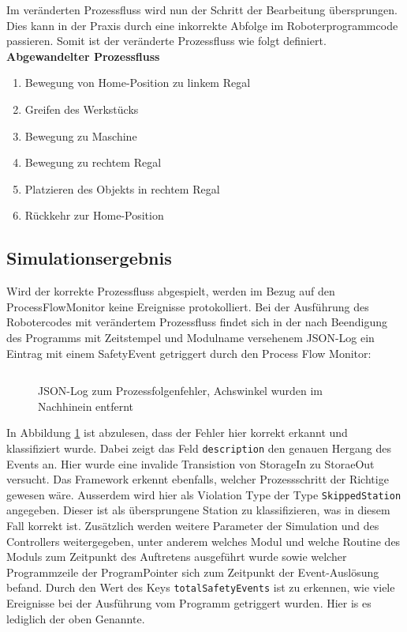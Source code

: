 Im veränderten Prozessfluss wird nun der Schritt der Bearbeitung übersprungen.
Dies kann in der Praxis durch eine inkorrekte Abfolge im Roboterprogrammcode
passieren. Somit ist der veränderte Prozessfluss wie folgt definiert.\\

\noindent
\textbf{Abgewandelter Prozessfluss}
\begin{enumerate}
  \item Bewegung von Home-Position zu linkem Regal
  \item Greifen des Werkstücks
  \item Bewegung zu Maschine
  \item Bewegung zu rechtem Regal
  \item Platzieren des Objekts in rechtem Regal
  \item Rückkehr zur Home-Position
\end{enumerate}

\subsection{Simulationsergebnis}
Wird der korrekte Prozessfluss abgespielt, werden im Bezug auf den
ProcessFlowMonitor keine Ereignisse protokolliert.
Bei der Ausführung des Robotercodes mit verändertem Prozessfluss findet sich in
der nach Beendigung des Programms mit Zeitstempel und Modulname versehenem
JSON-Log ein Eintrag mit einem SafetyEvent getriggert durch den
Process Flow Monitor:
\begin{figure}[H]
  \inputminted[fontsize=\footnotesize]{json}{code-snippets/processflowerror.json}
  \caption{JSON-Log zum Prozessfolgenfehler, Achswinkel wurden im Nachhinein
  entfernt}
  \label{listing:processflowerror}
\end{figure}

\noindent In Abbildung \ref{listing:processflowerror} ist abzulesen, dass der
Fehler hier korrekt erkannt und klassifiziert wurde. Dabei zeigt das Feld
\texttt{description} den genauen Hergang des Events an. Hier wurde eine invalide
Transistion von StorageIn zu StoraeOut versucht. Das Framework erkennt
ebenfalls, welcher Prozessschritt der Richtige gewesen wäre. Ausserdem wird hier
als Violation Type der Type \texttt{SkippedStation} angegeben. Dieser ist als
übersprungene Station zu klassifizieren, was in diesem Fall korrekt ist.
Zusätzlich werden weitere Parameter der Simulation und des Controllers
weitergegeben, unter anderem welches Modul und welche Routine des Moduls zum
Zeitpunkt des Auftretens ausgeführt wurde sowie welcher Programmzeile der
ProgramPointer sich zum Zeitpunkt der Event-Auslösung befand. Durch den Wert des
Keys \texttt{totalSafetyEvents} ist zu erkennen, wie viele Ereignisse bei der
Ausführung vom Programm getriggert wurden. Hier is es lediglich der oben
Genannte.

